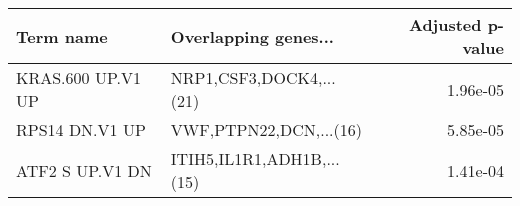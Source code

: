 \begin{tabular}{llr}
\toprule
        Term name &      Overlapping genes... &  Adjusted p-value \\
\midrule
KRAS.600 UP.V1 UP &   NRP1,CSF3,DOCK4,...(21) &          1.96e-05 \\
   RPS14 DN.V1 UP &    VWF,PTPN22,DCN,...(16) &          5.85e-05 \\
  ATF2 S UP.V1 DN & ITIH5,IL1R1,ADH1B,...(15) &          1.41e-04 \\
\bottomrule
\end{tabular}
